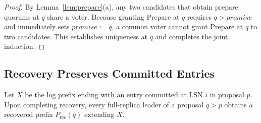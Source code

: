 \documentclass[sigconf,nonacm]{acmart}
\begin{document}
\begin{proof}
By Lemma~\ref{lem:prepare}(a), any two candidates that obtain
prepare quorums at \(q\) share a voter. Because granting Prepare at
\(q\) requires \(q>\mathit{promise}\) and immediately sets
\(\mathit{promise}:=q\), a common voter cannot grant Prepare at \(q\) to
two candidates. This establishes uniqueness at \(q\) and completes the
joint induction.
\end{proof}

\subsection{Recovery Preserves Committed Entries}
\label{sec:recovery}
\begin{lemma}\label{lem:recovery}
Let \(X\) be the log prefix ending with an entry committed at LSN \(i\)
in proposal \(p\). Upon completing recovery, every full-replica leader
of a proposal \(q>p\) obtains a recovered prefix \(P_{\mathrm{rec}}(q)\)
extending \(X\).
\end{lemma}
\end{document}
